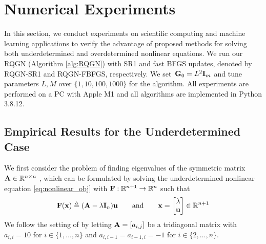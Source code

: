 \documentclass[11pt]{article}
\theoremstyle{plain}
\theoremstyle{definition}
\theoremstyle{remark}
\theoremstyle{plain}
\def\BR{{\mathbb{R}}}
\def\mF {{\bf F}}
\def\BR{{\mathbb{R}}}
\def\A{{\bf A}}
\def\F{{\bf F}}
\def\G{{\bf G}}
\def\I{{\bf I}}
\def\u{{\bf u}}
\def\x{{\bf x}}
\def\RB{{\mathbb R}}
\begin{document}


\section{Numerical Experiments}
\label{sec:exp}
In this section, we conduct experiments on scientific computing and machine learning applications to verify the advantage of proposed methods for solving both underdetermined and overdetermined nonlinear equations.
We run our RQGN (Algorithm \ref{alg:RQGN}) with SR1 and fast BFGS updates, denoted by RQGN-SR1 and RQGN-FBFGS, respectively.
We set~$\G_0=L^2\I_m$ and tune parameters $L,M$ over $\{1,10,100,1000\}$ for the algorithm.
All experiments are performed on a PC with Apple M1 and all algorithms are implemented in Python 3.8.12.



\subsection{Empirical Results for the Underdetermined Case}
We first consider the problem of finding eigenvalues of the symmetric matrix $\A\in\RB^{n\times n}$ \citep{vater2024convergence}, which can be formulated by solving the underdetermined nonlinear equation  \eqref{eq:nonlinear_obj} with $\mF:\BR^{n+1}\to\BR^n$ such that
\begin{align}
\label{eq:eigenfinding}
\F(\x)\triangleq (\A-\lambda\I_{n})\u
\qquad\text{and}\qquad
\x= \begin{bmatrix}
    \lambda \\ \u
\end{bmatrix}\in\RB^{n+1}    
\end{align}
We follow the setting of \citet{vater2024convergence} by letting $\A=[a_{i,j}]$ be a tridiagonal matrix with $a_{i,i}=10$ for $i\in\{1,\ldots,n\}$ and $a_{i,i-1}=a_{i-1,i}=-1$ for $i\in\{2,\ldots,n\}$. 
\end{document}
